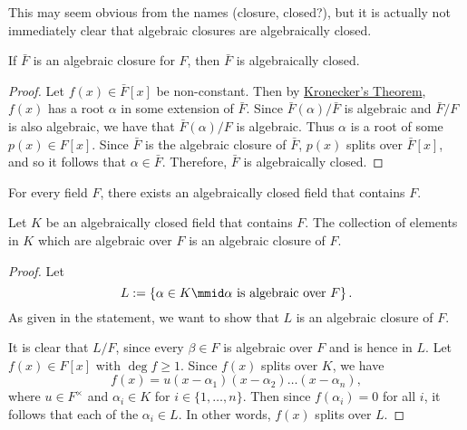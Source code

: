\documentclass[notoc,notitlepage,nobib]{tufte-book}
\begin{document}
This may seem obvious from the names (closure, closed?), but it is actually not
immediately clear that algebraic closures are algebraically closed.

\begin{propo}\label{propo:algebraic_closures_are_algebraically_closed}
  If $\bar{F}$ is an algebraic closure for $F$, then $\bar{F}$ is algebraically closed.
\end{propo}

\begin{proof}
  Let $f(x) \in \bar{F}[x]$ be non-constant. Then by
  \hyperref[thm:kronecker_s_theorem]{Kronecker's Theorem}, $f(x)$ has a root $\alpha$ in
  some extension of $\bar{F}$. Since $\bar{F}(\alpha) / \bar{F}$ is algebraic and $\bar{F}
  / F$ is also algebraic, we have that $\bar{F}(\alpha) / F$ is algebraic. Thus $\alpha$
  is a root of some $p(x) \in F[x]$. Since $\bar{F}$ is the algebraic closure of
  $\bar{F}$, $p(x)$ splits over $\bar{F}[x]$, and so it follows that $\alpha \in \bar{F}$.
  Therefore, $\bar{F}$ is algebraically closed.
\end{proof}

\begin{thm}\label{thm:every_field_has_an_algebraic_closure}
  For every field $F$, there exists an algebraically closed field that contains $F$.
\end{thm}

\begin{thm}\label{thm:adding_all_algebraic_elements_algebraically_closes_the field}
  Let $K$ be an algebraically closed field that contains $F$. The collection of elements
  in $K$ which are algebraic over $F$ is an algebraic closure of $F$.
\end{thm}

\begin{proof}
  Let
  \begin{equation*}
    L := \left\{ \alpha \in K \mmid \alpha \text{ is algebraic over } F \right\}.
  \end{equation*}
  As given in the statement, we want to show that $L$ is an algebraic closure of $F$.

  It is clear that $L / F$, since every $\beta \in F$ is algebraic over $F$ and is hence
  in $L$. Let $f(x) \in F[x]$ with $\deg f \geq 1$. Since $f(x)$ splits over $K$, we have
  \begin{equation*}
    f(x) = u(x - \alpha_1)(x - \alpha_2) \hdots (x - \alpha_n),
  \end{equation*}
  where $u \in F^\times$ and $\alpha_i \in K$ for $i \in \{ 1, \ldots, n \}$. Then since
  $f(\alpha_i) = 0$ for all $i$, it follows that each of the $\alpha_i \in L$. In other
  words, $f(x)$ splits over $L$.
\end{proof}
\end{document}
